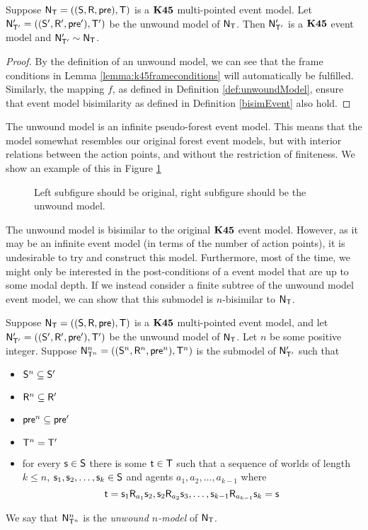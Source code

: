 \begin{lemma} \label{lemma:unwoundModel:bisimilar}
  Suppose $\mathrm{\mathsf{N}}_\mathrm{\mathsf{T}} = ((\mathrm{\mathsf{S}},\mathrm{\mathsf{R}},\mathrm{\mathsf{pre}}),\mathrm{\mathsf{T}})$ is a $\bf K45$ multi-pointed
  event model.
	Let $\mathrm{\mathsf{N}}'_{\mathrm{\mathsf{T}}'} = ((\mathrm{\mathsf{S}}',\mathrm{\mathsf{R}}',\mathrm{\mathsf{pre}}'),\mathrm{\mathsf{T}}')$ be the unwound model of $\mathrm{\mathsf{N}}_\mathrm{\mathsf{T}}$.
	Then $\mathrm{\mathsf{N}}'_{\mathrm{\mathsf{T}}'}$ is a $\bf K45$ event model and $\mathrm{\mathsf{N}}'_{\mathrm{\mathsf{T}}'} \sim \mathrm{\mathsf{N}}_\mathrm{\mathsf{T}}$.
\end{lemma}
\begin{proof}
	By the definition of an unwound model, we can see that the frame conditions in Lemma 
	\ref{lemma:k45frameconditions} will automatically be fulfilled.
	Similarly, the mapping $f$, as defined in Definition \ref{def:unwoundModel}, ensure that event
	model bisimilarity as defined in Definition \ref{bisimEvent} also hold.
\end{proof}

The unwound model is an infinite pseudo-forest event model.
This means that the model somewhat resembles our original forest event models,
but with interior relations between the action points, and without the
restriction of finiteness.
We show an example of this in Figure \ref{generatedTreeExample}

\begin{figure}[ht!]
\centering
\caption{\FIXME Left subfigure should be original, right subfigure should be the
unwound model.} \label{generatedTreeExample}
\end{figure}

The unwound model is bisimilar to the original $\bf K45$ event model.
However, as it may be an infinite event model (in terms of the number of action
points), it is undesirable to try and construct this model.
Furthermore, most of the time, we might only be interested in the
post-conditions of a event model that are up to some modal depth.
If we instead consider a finite subtree of the unwound model event
model, we can show that this submodel is $n$-bisimilar to $\mathrm{\mathsf{N}}_\mathrm{\mathsf{T}}$.

\begin{defn} \label{unwoundNModel}
  Suppose $\mathrm{\mathsf{N}}_\mathrm{\mathsf{T}} = ((\mathrm{\mathsf{S}},\mathrm{\mathsf{R}},\mathrm{\mathsf{pre}}),\mathrm{\mathsf{T}})$ is a $\bf K45$ multi-pointed
  event model, and let $\mathrm{\mathsf{N}}'_{\mathrm{\mathsf{T}}'} = ((\mathrm{\mathsf{S}}', \mathrm{\mathsf{R}}', \mathrm{\mathsf{pre}}'),\mathrm{\mathsf{T}}')$ be the unwound model of $\mathrm{\mathsf{N}}_\mathrm{\mathsf{T}}$.
  Let $n$ be some positive integer.
	Suppose $\mathrm{\mathsf{N}}^n_{\mathrm{\mathsf{T}}^n} = ((\mathrm{\mathsf{S}}^n,\mathrm{\mathsf{R}}^n,\mathrm{\mathsf{pre}}^n),\mathrm{\mathsf{T}}^n)$ is the submodel of $\mathrm{\mathsf{N}}'_{\mathrm{\mathsf{T}}'}$ such that
  \begin{itemize}
    \item $\mathrm{\mathsf{S}}^n \subseteq \mathrm{\mathsf{S}}'$
    \item $\mathrm{\mathsf{R}}^n \subseteq \mathrm{\mathsf{R}}'$
    \item $\mathrm{\mathsf{pre}}^n \subseteq \mathrm{\mathsf{pre}}'$
    \item $\mathrm{\mathsf{T}}^n = \mathrm{\mathsf{T}}'$
    \item for every $\mathrm{\mathsf{s}} \in \mathrm{\mathsf{S}}$ there is some $\mathrm{\mathsf{t}} \in \mathrm{\mathsf{T}}$ such that a
    sequence of worlds of length $k \leq n$, $\mathrm{\mathsf{s}}_1, \mathrm{\mathsf{s}}_2, \ldots, \mathrm{\mathsf{s}}_k \in \mathrm{\mathsf{S}}$ and agents
    $a_1,a_2, \ldots, a_{k-1}$ where
    \[
      \mathrm{\mathsf{t}} = \mathrm{\mathsf{s}}_1 \mathrm{\mathsf{R}}_{a_1} \mathrm{\mathsf{s}}_2, \mathrm{\mathsf{s}}_2 \mathrm{\mathsf{R}}_{a_2} \mathrm{\mathsf{s}}_3, \ldots,
      \mathrm{\mathsf{s}}_{k-1} \mathrm{\mathsf{R}}_{a_{k-1}} \mathrm{\mathsf{s}}_k = \mathrm{\mathsf{s}}
    \]
  \end{itemize}
  We say that $\mathrm{\mathsf{N}}^n_{\mathrm{\mathsf{T}}^n}$ is the {\em unwound $n$-model} of $\mathrm{\mathsf{N}}_\mathrm{\mathsf{T}}$.
\end{defn}

